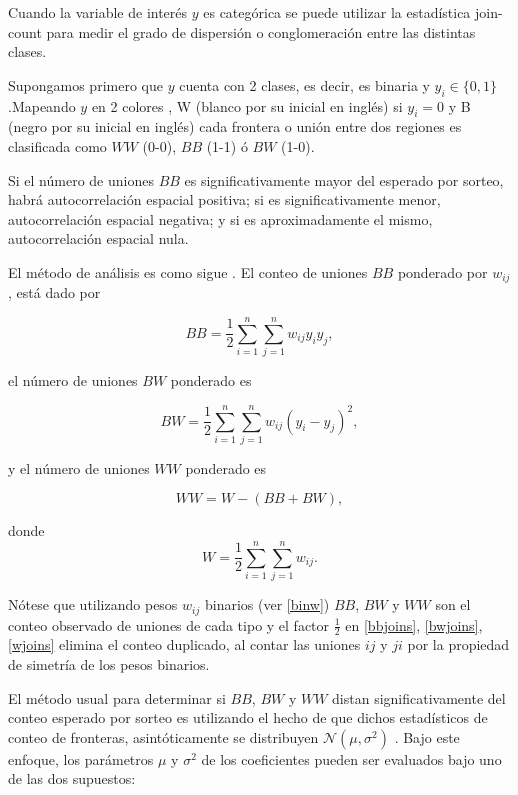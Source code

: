 Cuando la variable de interés $y$ es categórica se puede utilizar la estadística join-count para medir el grado de dispersión o conglomeración entre las distintas clases.

Supongamos primero que $y$ cuenta con 2 clases, es decir, es binaria y $y_{i}\in \lbrace 0,1 \rbrace$.Mapeando $y$ en 2 colores , W (blanco por su inicial en inglés) si $y_{i}=0$ y B (negro por su inicial en inglés) cada frontera o unión entre dos regiones es clasificada como $WW$ (0-0), $BB$  (1-1) ó $BW$ (1-0).

Si el número de uniones $BB$ es significativamente mayor del esperado por sorteo, habrá autocorrelación espacial positiva;  si es significativamente menor, autocorrelación espacial negativa; y si es aproximadamente el mismo, autocorrelación espacial nula.

El método de análisis es como sigue \citep{moran48}. El conteo de uniones $BB$ ponderado por $w_{ij}$, está dado por

\begin{equation} \label{bbjoins}
BB = \dfrac{1}{2} \sum_{i=1}^n\sum_{j=1}^n w_{ij} y_i y_j ,
\end{equation}

el número de uniones $BW$ ponderado es

\begin{equation} \label{bwjoins}
BW = \dfrac{1}{2} \sum_{i=1}^n\sum_{j=1}^n w_{ij} (y_i - y_j)^2,
\end{equation}

y el número de uniones $WW$ ponderado es

\begin{equation}
WW = W-(BB+BW),
\end{equation}

donde
\begin{equation} \label{wjoins}
 W = \dfrac{1}{2} \sum_{i=1}^n\sum_{j=1}^n w_{ij} .
\end{equation}

Nótese que utilizando pesos $w_{ij}$ binarios (ver \eqref{binw}) $BB$, $BW$ y $WW$ son el conteo observado de uniones de cada tipo y el factor $\frac{1}{2}$ en \eqref{bbjoins}, \eqref{bwjoins}, \eqref{wjoins} elimina el conteo duplicado, al contar las uniones $ij$ y $ji$ por la propiedad de simetría de los pesos binarios.


El método usual para determinar si $BB$, $BW$ y $WW$ distan significativamente del conteo esperado por sorteo es utilizando el hecho de que dichos estadísticos de conteo de fronteras, asintóticamente se distribuyen $\mathcal{N}(\mu, \sigma^2)$ \citep[Capítulo 2]{clifford1973}. Bajo este enfoque, los parámetros $\mu$ y $\sigma^2$ de los coeficientes pueden ser evaluados bajo uno de las dos supuestos:

